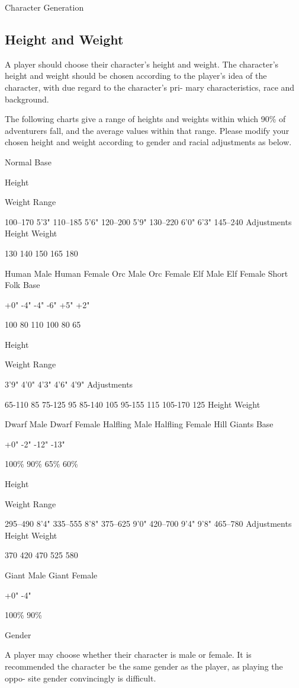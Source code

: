 \begin{Chapter}{Character Generation}
\subsection{Height and Weight}

A player should choose their character’s height and weight.  The
character’s height and weight should be chosen according to the
player’s idea of the character, with due regard to the character’s
pri- mary characteristics, race and background.

The following charts give a range of heights and weights within which
90\% of adventurers fall, and the average values within that range.
Please modify your chosen height and weight according to gender and
racial adjustments as below.

Normal Base  

Height  

Weight   Range 

100–170 
5’3"  
110–185 
5’6"  
120–200 
5’9"  
130–220 
6’0"  
6’3"  
145–240 
Adjustments   Height   Weight 

130  
140  
150  
165  
180  

Human Male  
Human Female  
Orc Male  
Orc Female  
Elf Male  
Elf Female  
Short Folk Base 

+0"  
-4"  
-4"  
-6"  
+5"  
+2"  

100%
80%
110%
100%
80%
65%

Height  

Weight   Range 

3’9"  
4’0"  
4’3"  
4’6"  
4’9"  
Adjustments  

65-110 
85  
75-125 
95  
85-140 
105  
95-155 
115  
105-170 
125  
Height   Weight 

Dwarf Male  
Dwarf Female  
Halﬂing Male  
Halﬂing Female  
Hill Giants Base 

+0"  
-2"  
-12"  
-13"  

100\% 
90\% 
65\% 
60\%  

Height  

Weight   Range 

295–490 
8’4"  
335–555 
8’8"  
375–625 
9’0"  
420–700 
9’4"  
9’8"  
465–780 
Adjustments   Height   Weight 

370  
420  
470  
525  
580  

Giant Male  
Giant Female  

+0"  
-4"  

100\% 
90\% 

Gender 

A  player  may  choose  whether  their  character  is 
male or female. It is recommended the character be 
the same gender as the player, as playing the oppo-
site gender convincingly is difficult. 


\end{Chapter}
